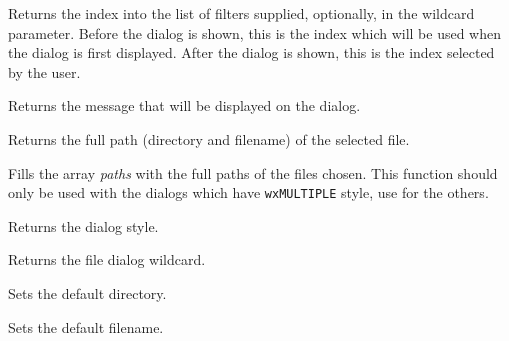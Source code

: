 \label{wxfiledialoggetfilterindex}


Returns the index into the list of filters supplied, optionally, in the wildcard parameter.
Before the dialog is shown, this is the index which will be used when the dialog is first displayed.
After the dialog is shown, this is the index selected by the user.

\label{wxfiledialoggetmessage}


Returns the message that will be displayed on the dialog.

\label{wxfiledialoggetpath}


Returns the full path (directory and filename) of the selected file.

\label{wxfiledialoggetpaths}


Fills the array {\it paths} with the full paths of the files chosen. This
function should only be used with the dialogs which have {\tt wxMULTIPLE} style,
use  for the others.

\label{wxfiledialoggetstyle}


Returns the dialog style.

\label{wxfiledialoggetwildcard}


Returns the file dialog wildcard.

\label{wxfiledialogsetdirectory}


Sets the default directory.

\label{wxfiledialogsetfilename}


Sets the default filename.

